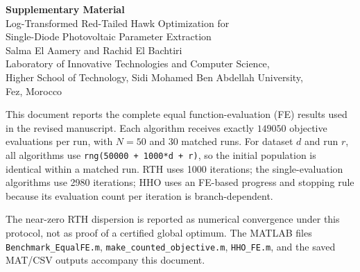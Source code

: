 \documentclass[12pt,a4paper]{article}
\begin{document}
\begin{center}
{\Large\bfseries Supplementary Material}\\[6pt]
{\large Log-Transformed Red-Tailed Hawk Optimization for\\
Single-Diode Photovoltaic Parameter Extraction}\\[4pt]
Salma El Aamery and Rachid El Bachtiri\\
Laboratory of Innovative Technologies and Computer Science,\\
Higher School of Technology, Sidi Mohamed Ben Abdellah University,\\
Fez, Morocco
\end{center}

This document reports the complete equal function-evaluation (FE) results used in the revised manuscript.  Each algorithm receives exactly $149050$ objective evaluations per run, with $N=50$ and 30 matched runs. For dataset $d$ and run $r$, all algorithms use \texttt{rng(50000 + 1000*d + r)}, so the initial population is identical within a matched run.  RTH uses 1000 iterations; the single-evaluation algorithms use 2980 iterations; HHO uses an FE-based progress and stopping rule because its evaluation count per iteration is branch-dependent.

The near-zero RTH dispersion is reported as numerical convergence under this protocol, not as proof of a certified global optimum.  The MATLAB files \texttt{Benchmark\_EqualFE.m}, \texttt{make\_counted\_objective.m}, \texttt{HHO\_FE.m}, and the saved MAT/CSV outputs accompany this document.
\end{document}
